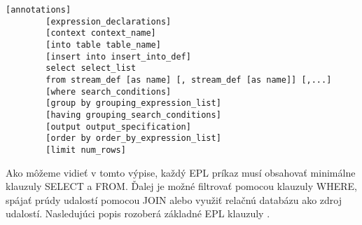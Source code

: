 		\begin{lstlisting}[label=lst:epl-syntax,caption=Vzor EPL syntaxe]
		[annotations]
		[expression_declarations]
		[context context_name]
		[into table table_name]
		[insert into insert_into_def]
		select select_list
		from stream_def [as name] [, stream_def [as name]] [,...]
		[where search_conditions]
		[group by grouping_expression_list]
		[having grouping_search_conditions]
		[output output_specification]
		[order by order_by_expression_list]
		[limit num_rows]
		\end{lstlisting}

		Ako môžeme vidieť v tomto výpise, každý EPL príkaz musí obsahovať minimálne klauzuly SELECT a FROM. Ďalej je možné filtrovať pomocou klauzuly WHERE, spájať prúdy udalostí pomocou JOIN alebo využiť relačnú databázu ako zdroj udalostí. Nasledujúci popis rozoberá základné EPL klauzuly \cite{web:Esper-doc}.
		
